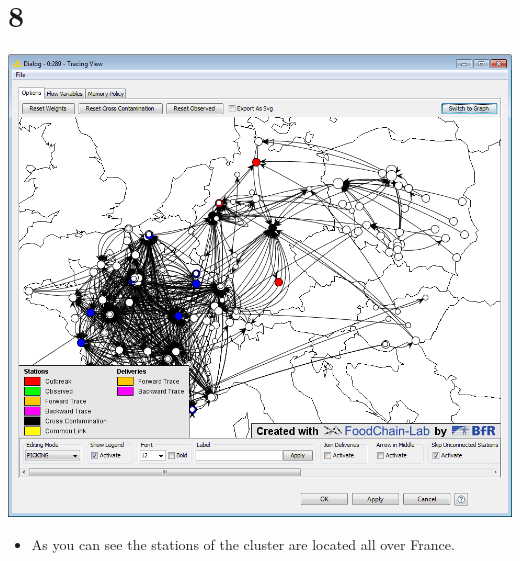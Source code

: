 \documentclass{beamer}
\begin{document}
\section{8}
\begin{frame}
	\begin{center}
  		\includegraphics[height=0.6\textheight]{8.png}
	\end{center}
	\begin{itemize}
		\item As you can see the stations of the cluster are located all over France.
	\end{itemize}
\end{frame}
\end{document}
